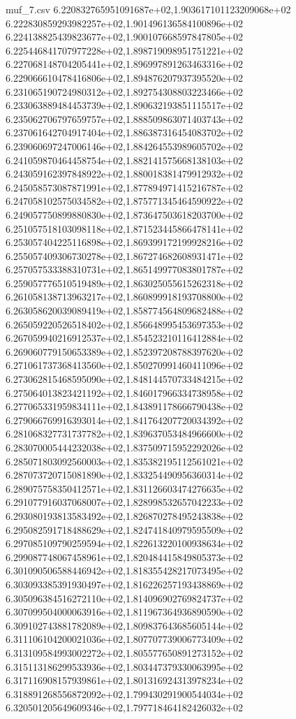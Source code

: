 \begin{filecontents*}{muf_7.csv}
6.220832765951091687e+02,1.903617101123209068e+02
6.222830859293982257e+02,1.901496136584100896e+02
6.224138825439823677e+02,1.900107668597847805e+02
6.225446841707977228e+02,1.898719098951751221e+02
6.227068148704205441e+02,1.896997891263463316e+02
6.229066610478416806e+02,1.894876207937395520e+02
6.231065190724980312e+02,1.892754308803223466e+02
6.233063889484453739e+02,1.890632193851115517e+02
6.235062706797659757e+02,1.888509863071403743e+02
6.237061642704917404e+02,1.886387316454083702e+02
6.239060697247006146e+02,1.884264553989605702e+02
6.241059870464458754e+02,1.882141575668138103e+02
6.243059162397848922e+02,1.880018381479912932e+02
6.245058573087871991e+02,1.877894971415216787e+02
6.247058102575034582e+02,1.875771345464590922e+02
6.249057750899880830e+02,1.873647503618203700e+02
6.251057518103098118e+02,1.871523445866478141e+02
6.253057404225116898e+02,1.869399172199928216e+02
6.255057409306730278e+02,1.867274682608931471e+02
6.257057533388310731e+02,1.865149977083801787e+02
6.259057776510519489e+02,1.863025055615262318e+02
6.261058138713963217e+02,1.860899918193708800e+02
6.263058620039089419e+02,1.858774564809682488e+02
6.265059220526518402e+02,1.856648995453697353e+02
6.267059940216912537e+02,1.854523210116412884e+02
6.269060779150653389e+02,1.852397208788397620e+02
6.271061737368413560e+02,1.850270991460411096e+02
6.273062815468595090e+02,1.848144570733484215e+02
6.275064013823421192e+02,1.846017966334738958e+02
6.277065331959834111e+02,1.843891178666790438e+02
6.279066769916393014e+02,1.841764207720034392e+02
6.281068327731737782e+02,1.839637053484966600e+02
6.283070005444232038e+02,1.837509715952292026e+02
6.285071803092560003e+02,1.835382195112561021e+02
6.287073720715081890e+02,1.833254490956360314e+02
6.289075758350412571e+02,1.831126603474276635e+02
6.291077916037068007e+02,1.828998532657042233e+02
6.293080193813583492e+02,1.826870278495243838e+02
6.295082591718488629e+02,1.824741840979595509e+02
6.297085109790259594e+02,1.822613220100938634e+02
6.299087748067458961e+02,1.820484415849805373e+02
6.301090506588446942e+02,1.818355428217073495e+02
6.303093385391930497e+02,1.816226257193438869e+02
6.305096384516272110e+02,1.814096902769824737e+02
6.307099504000063916e+02,1.811967364936890590e+02
6.309102743881782089e+02,1.809837643685605144e+02
6.311106104200021036e+02,1.807707739006773409e+02
6.313109584993002272e+02,1.805577650891273152e+02
6.315113186299533936e+02,1.803447379330063995e+02
6.317116908157939861e+02,1.801316924313978234e+02
6.318891268556872092e+02,1.799430291900544034e+02
6.320501205649609346e+02,1.797718464182426032e+02

\end{filecontents*}
